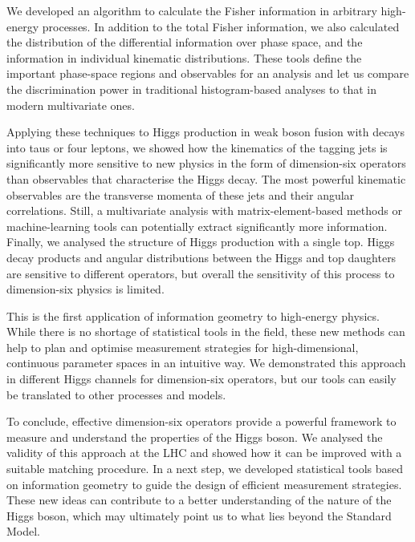We developed an algorithm to calculate the Fisher information in
arbitrary high-energy processes. In addition to the total Fisher
information, we also calculated the distribution of the differential
information over phase space, and the information in individual
kinematic distributions. These tools define the important phase-space
regions and observables for an analysis and let us compare the
discrimination power in traditional histogram-based analyses to that
in modern multivariate ones.

Applying these techniques to Higgs production in weak boson fusion
with decays into taus or four leptons, we showed how the kinematics of
the tagging jets is significantly more sensitive to new physics in the
form of dimension-six operators than observables that characterise the
Higgs decay. The most powerful kinematic observables are the
transverse momenta of these jets and their angular correlations. Still, a
multivariate analysis with matrix-element-based methods or
machine-learning tools can potentially extract significantly more
information. Finally, we analysed the structure of Higgs production
with a single top. Higgs decay products and angular distributions
between the Higgs and top daughters are sensitive to different
operators, but overall the sensitivity of this process to
dimension-six physics is limited.

This is the first application of information geometry to high-energy
physics. While there is no shortage of statistical tools in the field,
these new methods can help to plan and optimise measurement strategies
for high-dimensional, continuous parameter spaces in an intuitive
way. We demonstrated this approach in different Higgs channels for
dimension-six operators, but our tools can easily be translated to
other processes and models.

\newparagraph
%
To conclude, effective dimension-six operators provide a powerful
framework to measure and understand the properties of the Higgs
boson. We analysed the validity of this approach at the LHC and showed
how it can be improved with a suitable matching procedure. In a next
step, we developed statistical tools based on information geometry to
guide the design of efficient measurement strategies. These new ideas
can contribute to a better understanding of the nature of the Higgs
boson, which may ultimately point us to what lies beyond the Standard
Model.
